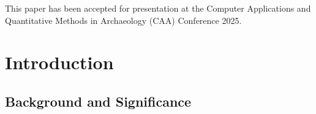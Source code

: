 \documentclass[11pt,a4paper,oneside]{report}
\begin{document}
This paper has been accepted for presentation at the Computer Applications and Quantitative Methods in Archaeology (CAA) Conference 2025. 

\newpage


\setcounter{tocdepth}{1}
\listoffigures\newpage


\setcounter{tocdepth}{1}
\listoftables\newpage


\clearpage
{}


\chapter{Introduction}
\label{introduction}


\section{Background and Significance}
\end{document}
